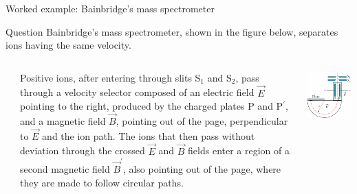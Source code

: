 
%
%

{
\problemslide

\begin{frame}{Worked example: Bainbridge's mass spectrometer}

  \begin{blockexmplque}{Question}
    Bainbridge’s mass spectrometer, shown in the figure below,
    separates ions having the same velocity.
    \vspace{0.3cm}
    \begin{columns}
      \begin{column}{0.01\textwidth}
      \end{column}
      \begin{column}{0.59\textwidth}
      Positive ions, after entering through slits S$_1$ and S$_2$,
      pass through a velocity selector composed of an electric field $\vec{E}$
      pointing to the right, produced by the charged plates P and P$^\prime$,
      and a magnetic field $\vec{B}$, pointing out of the page,
      perpendicular to $\vec{E}$ and the ion path. The ions that then pass
      without deviation through the crossed $\vec{E}$ and $\vec{B}$ fields
      enter a region of a second magnetic field $\vec{B}^\prime$, also pointing
      out of the page, where they are made to follow circular paths.
      \end{column}
      \begin{column}{0.40\textwidth}
        \begin{center}
          \includegraphics[width=0.99\textwidth]{./images/problems/lect05_bainbridge_1}\\

\end{center}
\end{column}
\end{columns}
\end{blockexmplque}
\end{frame}}
